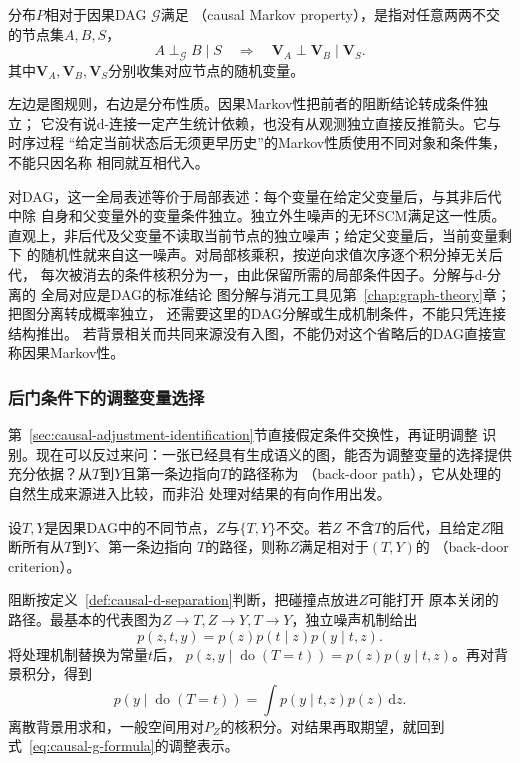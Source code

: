 \begin{definition}[因果Markov性]
  \label{def:causal-markov-property}
  分布\(P\)相对于因果DAG \(\mathcal G\)满足
  （causal Markov property），是指对任意两两不交的节点集\(A,B,S\)，
  \[
    A\perp_{\mathcal G}B\mid S
    \quad\Longrightarrow\quad
    \bm V_A\perp\bm V_B\mid\bm V_S.
  \]
  其中\(\bm V_A,\bm V_B,\bm V_S\)分别收集对应节点的随机变量。
\end{definition}

左边是图规则，右边是分布性质。因果Markov性把前者的阻断结论转成条件独立；
它没有说d-连接一定产生统计依赖，也没有从观测独立直接反推箭头。它与时序过程
“给定当前状态后无须更早历史”的Markov性质使用不同对象和条件集，不能只因名称
相同就互相代入。

对DAG，这一全局表述等价于局部表述：每个变量在给定父变量后，与其非后代中除
自身和父变量外的变量条件独立。独立外生噪声的无环SCM满足这一性质。
直观上，非后代及父变量不读取当前节点的独立噪声；给定父变量后，当前变量剩下
的随机性就来自这一噪声。对局部核乘积，按逆向求值次序逐个积分掉无关后代，
每次被消去的条件核积分为一，由此保留所需的局部条件因子。分解与d-分离的
全局对应是DAG的标准结论
图分解与消元工具见第~\ref{chap:graph-theory}章；把图分离转成概率独立，
还需要这里的DAG分解或生成机制条件，不能只凭连接结构推出。
若背景相关而共同来源没有入图，不能仍对这个省略后的DAG直接宣称因果Markov性。

\subsubsection{后门条件下的调整变量选择}
\label{sec:causal-backdoor-selection}

第~\ref{sec:causal-adjustment-identification}节直接假定条件交换性，再证明调整
识别。现在可以反过来问：一张已经具有生成语义的图，能否为调整变量的选择提供
充分依据？从\(T\)到\(Y\)且第一条边指向\(T\)的路径称为
（back-door path），它从处理的自然生成来源进入比较，而非沿
处理对结果的有向作用出发。

\begin{definition}
  \label{def:causal-backdoor-criterion}
  设\(T,Y\)是因果DAG中的不同节点，\(Z\)与\(\{T,Y\}\)不交。若\(Z\)
  不含\(T\)的后代，且给定\(Z\)阻断所有从\(T\)到\(Y\)、第一条边指向
  \(T\)的路径，则称\(Z\)满足相对于\((T,Y)\)的
  （back-door criterion）。
\end{definition}

阻断按定义~\ref{def:causal-d-separation}判断，把碰撞点放进\(Z\)可能打开
原本关闭的路径。最基本的代表图为\(Z\to T,Z\to Y,T\to Y\)，独立噪声机制给出
\[
  p(z,t,y)=p(z)p(t\mid z)p(y\mid t,z).
\]
将处理机制替换为常量\(t\)后，
\(p(z,y\mid\operatorname{do}(T=t))=p(z)p(y\mid t,z)\)。再对背景积分，得到
\begin{equation}
  p(y\mid\operatorname{do}(T=t))
  =
  \int p(y\mid t,z)p(z)\,\mathrm dz.
  \label{eq:causal-backdoor-adjustment}
\end{equation}
离散背景用求和，一般空间用对\(P_Z\)的核积分。对结果再取期望，就回到
式~\eqref{eq:causal-g-formula}的调整表示。

